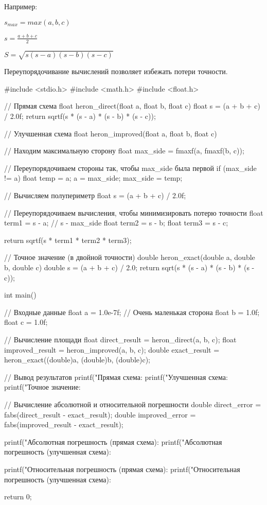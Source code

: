 \documentclass{report}
\begin{document}
			Например:
			\begin{center}
				$s_{max} = max(a, b, c)$
			
			
		
				$s = \frac{a + b + c}{2}$
	
			
		
				$S = \sqrt{s(s - a)(s - b)(s - c)}$
			\end{center}
			
			Переупорядочивание вычислений позволяет избежать потери точности.
			
			\begin{code}
#include <stdio.h>
#include <math.h>
#include <float.h>

// Прямая схема
float heron_direct(float a, float b, float c) {
	float s = (a + b + c) / 2.0f;
	return sqrtf(s * (s - a) * (s - b) * (s - c));
}

// Улучшенная схема
float heron_improved(float a, float b, float c) {
	// Находим максимальную сторону
	float max_side = fmaxf(a, fmaxf(b, c));
	
	// Переупорядочиваем стороны так, чтобы max_side была первой
	if (max_side != a) {
		float temp = a;
		a = max_side;
		max_side = temp;
	}
	
	// Вычисляем полупериметр
	float s = (a + b + c) / 2.0f;
	
	// Переупорядочиваем вычисления, чтобы минимизировать потерю точности
	float term1 = s - a;  // s - max_side
	float term2 = s - b;
	float term3 = s - c;
	
	return sqrtf(s * term1 * term2 * term3);
}

// Точное значение (в двойной точности)
double heron_exact(double a, double b, double c) {
	double s = (a + b + c) / 2.0;
	return sqrt(s * (s - a) * (s - b) * (s - c));
}

int main() {
	// Входные данные
	float a = 1.0e-7f;  // Очень маленькая сторона
	float b = 1.0f;
	float c = 1.0f;
	
	// Вычисление площади
	float direct_result = heron_direct(a, b, c);
	float improved_result = heron_improved(a, b, c);
	double exact_result = heron_exact((double)a, (double)b, (double)c);
	
	// Вывод результатов
	printf("Прямая схема: %
	printf("Улучшенная схема: %
	printf("Точное значение: %
	
	// Вычисление абсолютной и относительной погрешности
	double direct_error = fabs(direct_result - exact_result);
	double improved_error = fabs(improved_result - exact_result);
	
	printf("Абсолютная погрешность (прямая схема): %
	printf("Абсолютная погрешность (улучшенная схема): %
	
	printf("Относительная погрешность (прямая схема): %
	printf("Относительная погрешность (улучшенная схема): %
	
	return 0;
}
\end{code}				
\end{document}
